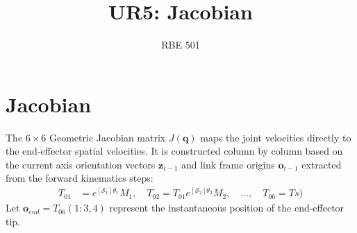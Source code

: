 \documentclass[11pt]{article}
\title{UR5: Jacobian}
\author{RBE 501}
\date{}
\begin{document}
\maketitle

\section{Jacobian}

The $6 \times 6$ Geometric Jacobian matrix $J(\mathbf{q})$ maps the joint velocities directly to the end-effector spatial velocities. It is constructed column by column based on the current axis orientation vectors $\mathbf{z}_{i-1}$ and link frame origins $\mathbf{o}_{i-1}$ extracted from the forward kinematics steps:
\begin{align}
  T_{01} &= e^{[\mathcal{S}_1]\theta_1} M_{1}, \quad T_{02} = T_{01}e^{[\mathcal{S}_2]\theta_2} M_{2}, \quad \dots, \quad T_{06} = Ts)
\end{align}
Let $\mathbf{o}_{end} = T_{06}(1:3, 4)$ represent the instantaneous position of the end-effector tip.
\end{document}
